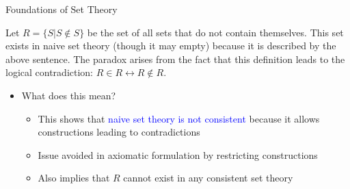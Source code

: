 \documentclass[10pt,english]{beamer}
\begin{document}
\begin{frame}{Foundations of Set Theory}

\begin{example}
Let $R = \{S|S\notin S\}$ be the set of all sets that do not contain themselves.
This set exists in naive set theory (though it may empty) because it is described by the above sentence.
The paradox arises from the fact that this definition leads to the logical contradiction: $R\in R \leftrightarrow R\notin R$.
\end{example}

\vspace{5mm}

\begin{itemize}
\setlength\itemsep{3mm}
\item<1-> What does this mean? \vspace{1mm}
\begin{itemize} 
  \setlength\itemsep{1.5mm}
  \item This shows that \textcolor{blue}{naive set theory is not consistent} because it allows constructions leading to contradictions
  \item Issue avoided in axiomatic formulation by restricting constructions
  \item Also implies that $R$ cannot exist in any consistent set theory
\end{itemize}

\end{itemize}
\end{frame}
\end{document}
